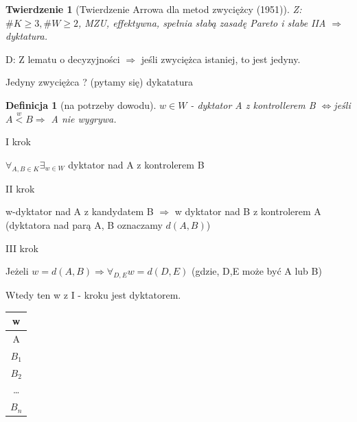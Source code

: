 \documentclass[12pt,a4paper]{article}
\theoremstyle{break}
\newtheorem{definition}{Definicja}[section]
\newtheorem{theorem}{Twierdzenie}[section]
\newcommand{\witw}{$\Leftrightarrow$}
\begin{document}
				
		\begin{theorem}[Twierdzenie Arrowa dla metod zwyciężcy (1951)]
			Z: $\# K \geq 3, \#W\geq2$, MZU, effektywna, spełnia słabą zasadę Pareto i słabe IIA $\Rightarrow$ dyktatura.
		\end{theorem}
		
		D: Z lematu o decyzyjności $\Rightarrow$ jeśli zwyciężca istaniej, to jest jedyny.
		
		Jedyny zwyciężca ? (pytamy się) dykatatura
		
		\begin{definition}[na potrzeby dowodu]
			$w\in W$ - dyktator A z kontrollerem B \witw jeśli $A\overset{w}{<}B \Rightarrow$ A nie wygrywa.
		\end{definition}
		
		I krok
		
		$\forall_{A,B \in K} \exists_{w\in W}$ dyktator nad A z kontrolerem B
		
		II krok
		
		w-dyktator nad A z kandydatem B $\Rightarrow$ w dyktator nad B z kontrolerem A (dyktatora nad parą A, B oznaczamy $d(A,B)$)
		
		III krok
		
		Jeżeli $w=d(A,B) \Rightarrow \forall_{D,E} w = d(D,E)$ (gdzie, D,E może być A lub B)
		
		Wtedy ten w z I - kroku jest dyktatorem. 
		
		\begin{tabular}{|c|}\hline
			w \\\hline
			A \\\hline
			$B_1$ \\\hline
			$B_2$ \\\hline
			\dots\\\hline
			$B_n$ \\\hline
		\end{tabular}
		
\end{document}
